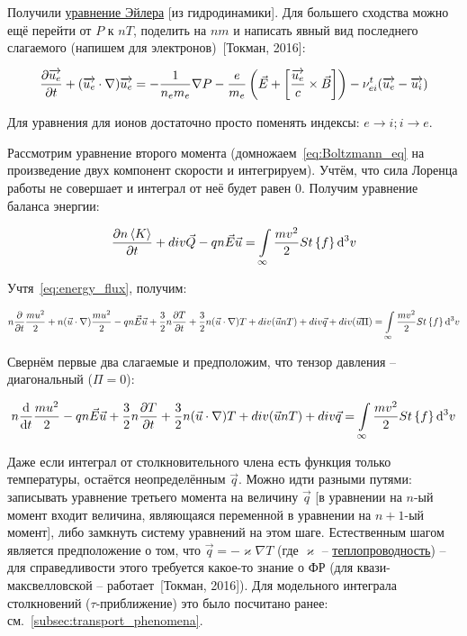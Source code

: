 \documentclass[10pt, a4paper]{article}
\newcommand{\Tokman}{~[Токман, 2016]}
\begin{document}
Получили \uline{уравнение Эйлера} [из гидродинамики]. Для большего сходства можно ещё перейти от $P$ к $nT$, поделить на $nm$ и написать явный вид последнего слагаемого (напишем для электронов)\Tokman:

\begin{equation} \label{eq:Euler_eq}
	\pdv{\overrightarrow{u_e}}{t}+(\overrightarrow{u_e}\cdot\nabla)\overrightarrow{u_e} = -\frac{1}{n_em_e}\nabla P -\frac{e}{m_e}\left(\vec{E}+\left[\frac{\overrightarrow{u_e}}{c}\times\vec{B}\right]\right)-\nu_{ei}^{t}(\overrightarrow{u_e}-\overrightarrow{u_i})
\end{equation}

Для уравнения для ионов достаточно просто поменять индексы: $e\rightarrow i; i\rightarrow e$.

Рассмотрим уравнение второго момента (домножаем~\eqref{eq:Boltzmann_eq} на произведение двух компонент скорости и интегрируем). Учтём, что сила Лоренца работы не совершает и интеграл от неё будет равен 0. Получим уравнение баланса энергии:

\begin{equation*}
	\pdv{n\left\langle K\right\rangle}{t}+div\vec{Q}-qn\vec{E}\vec{u}=\int\limits_\infty\frac{mv^2}{2}St\left\lbrace f\right\rbrace \dd[3]{v}
\end{equation*}

Учтя~\eqref{eq:energy_flux}, получим:

\begin{equation*}
	n\pdv{}{t}\frac{mu^2}{2}+n(\vec{u}\cdot\nabla)\frac{mu^2}{2}-qn\vec{E}\vec{u}+\frac{3}{2}n\pdv{T}{t}+\frac{3}{2}n(\vec{u}\cdot\nabla)T+div(\vec{u}nT)+div\vec{q}+div(\vec{u}\Pi)=\int\limits_\infty\frac{mv^2}{2}St\left\lbrace f\right\rbrace \dd[3]{v}
\end{equation*}

Свернём первые два слагаемые и предположим, что тензор давления -- диагональный ($\Pi = 0$):

\begin{equation*}
	n\dv{}{t}\frac{mu^2}{2}-qn\vec{E}\vec{u}+\frac{3}{2}n\pdv{T}{t}+\frac{3}{2}n(\vec{u}\cdot\nabla)T+div(\vec{u}nT)+div\vec{q}=\int\limits_\infty\frac{mv^2}{2}St\left\lbrace f\right\rbrace \dd[3]{v}
\end{equation*}

Даже если интеграл от столкновительного члена есть функция только температуры, остаётся неопределённым $\vec{q}$. Можно идти разными путями: записывать уравнение третьего момента на величину $\vec{q}$ [в уравнении на $n$-ый момент входит величина, являющаяся переменной в уравнении на $n+1$-ый момент], либо замкнуть систему уравнений на этом шаге. Естественным шагом является предположение о том, что $\vec{q}=-\varkappa\nabla T$ (где $\varkappa$ -- \uline{теплопроводность}) -- для справедливости этого требуется какое-то знание о ФР (для квази-максвелловской -- работает\Tokman). Для модельного интеграла столкновений ($\tau$-приближение) это было посчитано ранее: см.~\eqref{subsec:transport_phenomena}.
\end{document}
